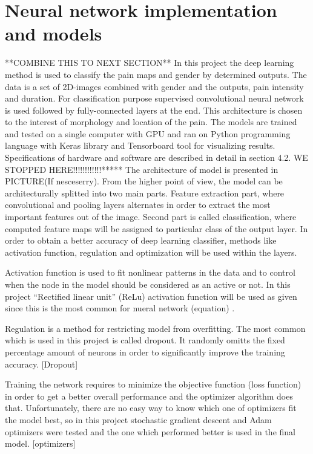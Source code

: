 \section{Neural network implementation and models} **COMBINE THIS TO NEXT SECTION**
In this project the deep learning method is used to classify the pain maps and gender by determined outputs. The data is a set of 2D-images combined with gender and the outputs, pain intensity and duration. For classification purpose supervised convolutional neural network is used followed by fully-connected layers at the end. This architecture is chosen to the interest of morphology and location of the pain. The models are trained and tested on a single computer with GPU and ran on Python programming language with Keras library and Tensorboard tool for visualizing results. Specifications of hardware and software are described in detail in section 4.2.
WE STOPPED HERE!!!!!!!!!!!!*****
\noindent
The architecture of model is presented in PICTURE(If nesceserry). From the higher point of view, the model can be architecturally splitted into two main parts. Feature extraction part, where convolutional and pooling layers alternates in order to extract the most important features out of the image. Second part is called classification, where computed feature maps will be assigned to particular class of the output layer. In order to obtain a better accuracy of deep learning classifier, methods like activation function, regulation and optimization will be used within the layers.

\noindent
Activation function is used to fit nonlinear patterns in the data and to control when the node in the model should be considered as an active or not.  In this project “Rectified linear unit” (ReLu) activation function will be used as given since this is the most common for nueral network (equation)  \citep{Goodfellow2016}.

\noindent
Regulation is a method for restricting model from overfitting. The most common which is used in this project is called dropout. It randomly omitts the fixed percentage amount of neurons in order to significantly improve the training accuracy. [Dropout]

\noindent
Training the network requires to minimize the objective function (loss function) in order to get a better overall performance and the optimizer algorithm does that. Unfortunately, there are no easy way to know which one of optimizers fit the model best, so in this project stochastic gradient descent and Adam optimizers were tested and the one which performed better is used in the final model. [optimizers]

